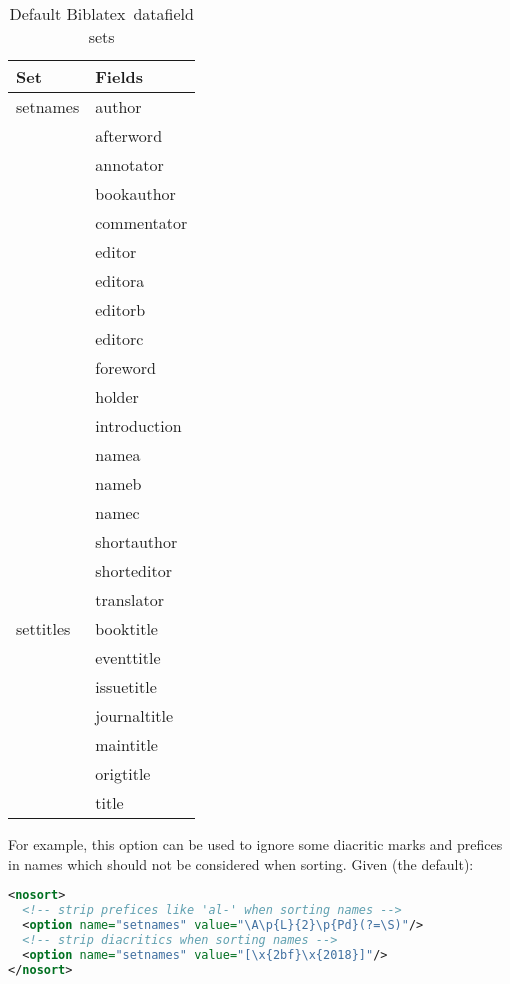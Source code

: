 \documentclass{ltxdockit}
\newcommand*{\biblatex}{Biblatex\xspace}
\begin{document}
\begin{table}
\begin{center}
\small
\begin{tabular}{ll}
\toprule
Set & Fields\\
\midrule
setnames & author\\
          & afterword\\
          & annotator\\
          & bookauthor\\
          & commentator\\
          & editor\\
          & editora\\
          & editorb\\
          & editorc\\
          & foreword\\
          & holder\\
          & introduction\\
          & namea\\
          & nameb\\
          & namec\\
          & shortauthor\\
          & shorteditor\\
          & translator\\
settitles & booktitle\\
           & eventtitle\\
           & issuetitle\\
           & journaltitle\\
           & maintitle\\
           & origtitle\\
           & title\\
\bottomrule
\end{tabular}
\end{center}
\caption{Default \biblatex\ datafield sets}
\label{tab:nst}
\end{table}

For example, this option can be used to ignore some diacritic marks and prefices
in names which should not be considered when sorting. Given (the default):

\begin{lstlisting}[language=xml]
<nosort>
  <!-- strip prefices like 'al-' when sorting names -->
  <option name="setnames" value="\A\p{L}{2}\p{Pd}(?=\S)"/>
  <!-- strip diacritics when sorting names -->
  <option name="setnames" value="[\x{2bf}\x{2018}]"/>
</nosort>
\end{lstlisting}
\end{document}
